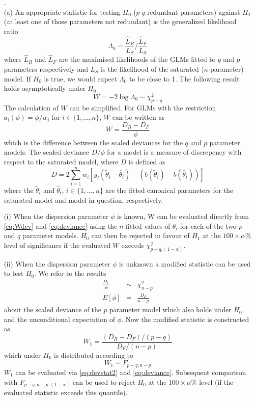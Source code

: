 \documentclass[a4paper,11pt]{article}
\begin{document}
.\\
(a) An appropriate statistic for testing $H_0$ ($p$-$q$ redundant parameters) against $H_1$ (at least one of those parameters not redundant) is the generalized likelihood ratio
\begin{equation*}
\Lambda_0 = \frac{\hat{L}_R}{L_S}/\frac{\hat{L}_F}{L_S}
\end{equation*}
where $\hat{L}_R$ and $\hat{L}_F$ are the maximised likelihoods of the GLMs fitted to $q$ and $p$ parameters respectively and $L_S$ is the likelihood of the saturated ($n$-parameter) model. If $H_0$ is true, we would expect $\Lambda_0$ to be close to 1. The following result holds asymptotically under $H_0$
\begin{equation*}
W = -2\log\Lambda_0 \sim \chi^2_{p-q}
\end{equation*}
The calculation of $W$ can be simplified. For GLMs with the restriction $a_i(\phi)=\phi/w_i$ for $i\in\{1,\dots,n\}$, $W$ can be written as
\begin{equation}\label{eq:Wdev}
W=\frac{D_R-D_F}{\phi}
\end{equation}
which is the difference between the scaled deviances for the $q$ and $p$ parameter models. The scaled deviance $D/\phi$ for a model is a measure of discrepency with respect to the saturated model, where $D$ is defined as
\begin{equation}\label{eq:deviance}
D = 2\sum_{i=1}^{n}w_i[y_i(\tilde\theta_i-\hat\theta_i)-(b(\tilde\theta_i)-b(\hat\theta_i))]
\end{equation}
where the $\tilde\theta_i$ and $\hat\theta_i$, $i\in\{1,\dots,n\}$ are the fitted canonical parameters for the saturated model and model in question, respectively.

(i) When the dispersion parameter $\phi$ is known, W can be evaluated directly from \eqref{eq:Wdev} and \eqref{eq:deviance} using the $n$ fitted values of $\theta_i$ for each of the two $p$ and $q$ parameter models. $H_0$ can then be rejected in favour of $H_1$ at the $100\times\alpha\%$ level of significance if the evaluated $W$ exceeds $\chi^2_{p-q,(1-\alpha)}$.

(ii) When the dispersion parameter $\phi$ is unknown a modified statistic can be used to test $H_0$. We refer to the results
\begin{eqnarray}
\label{eq:devstat}
\frac{D_F}{\phi} & \sim & \chi^2_{n-p}\\
\nonumber
E[\phi] & = & \frac{D_F}{n-p}
\end{eqnarray}
about the scaled deviance of the $p$ parameter model which also holds under $H_0$ and the unconditional expectation of $\phi$. Now the modified statistic is constructed as
\begin{equation}\label{eq:devstat2}
W_1 = \frac{(D_R-D_F)/(p-q)}{D_F/(n-p)}
\end{equation}
which under $H_0$ is distributed according to
\begin{equation*}
W_1 \sim F_{p-q,n-p}
\end{equation*}
$W_1$ can be evaluated via \eqref{eq:devstat2} and \eqref{eq:deviance}. Subsequent comparison with $F_{p-q,n-p,(1-\alpha)}$ can be used to reject $H_0$ at the $100\times\alpha\%$ level (if the evaluated statistic exceeds this quantile).
\end{document}
